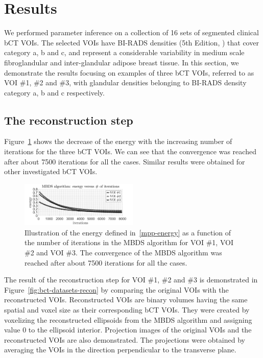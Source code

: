 \documentclass[journal]{IEEEtran}
\begin{document}
\section{Results}
\label{sec:results}

We performed parameter inference on a collection of 16 sets of
segmented clinical bCT VOIs. The selected VOIs have BI-RADS densities
(5th Edition, \cite{d2013acr}) that cover category a, b and c, and
represent a considerable variability in medium scale fibroglandular
and inter-glandular adipose breast tissue. In this section, we
demonstrate the results focusing on examples of three bCT VOIs,
referred to as VOI \#1, \#2 and \#3, with glandular densities
belonging to BI-RADS density category a, b and c respectively.

\subsection{The reconstruction step}
\label{sec:reconstruction-step}

Figure~\ref{fig:conv-mbds} shows the decrease of the energy with the
increasing number of iterations for the three bCT VOIs. We can see
that the convergence was reached after about 7500 iterations for all
the cases. Similar results were obtained for other investigated bCT
VOIs.

\begin{figure}[!htb]
  \centering \includegraphics[width=0.5\textwidth]
  {figure/convergence_mbds}
  \caption{Illustration of the energy defined in~\eqref{mpp-energy} as
    a function of the number of iterations in the MBDS algorithm for
    VOI \#1, VOI \#2 and VOI \#3. The convergence of the MBDS
    algorithm was reached after about 7500 iterations for all the
    cases.}
  \label{fig:conv-mbds}
\end{figure}

The result of the reconstruction step for VOI \#1, \#2 and \#3 is
demonstrated in Figure~\ref{fig:bct-datasets-recon} by comparing the
original VOIs with the reconstructed VOIs. Reconstructed VOIs are
binary volumes having the same spatial and voxel size as their
corresponding bCT VOIs. They were created by voxelizing the
reconstructed ellipsoids from the MBDS algorithm and assigning value 0
to the ellipsoid interior. Projection images of the original VOIs and
the reconstructed VOIs are also demonstrated. The projections were
obtained by averaging the VOIs in the direction perpendicular to the
transverse plane.
\end{document}
